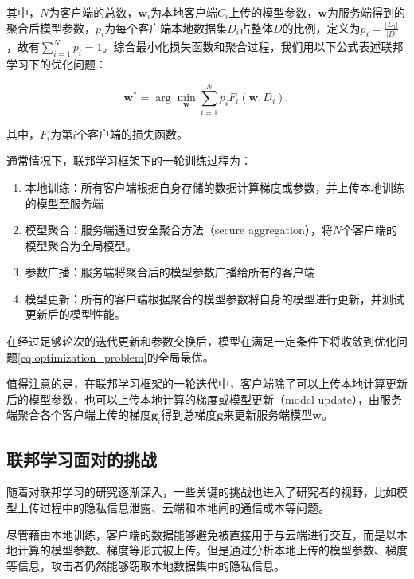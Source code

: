 其中，$N$为客户端的总数，$\mathbf{w}_i$为本地客户端$C_i$上传的模型参数，$\mathbf{w}$为服务端得到的聚合后模型参数，$p_i$为每个客户端本地数据集$D_i$占整体$D$的比例，定义为$p_i=\frac{|D_i|}{|D|}$，故有$\sum_{i = 1}^Np_i = 1$。综合最小化损失函数和聚合过程，我们用以下公式表述联邦学习下的优化问题：

\begin{equation}
  \mathbf{w}^* = \arg\min_{\mathbf{w}}\sum_{i = 1}^{N}p_iF_i(\mathbf{w}, D_i),
  \label{eq:optimization_problem}
\end{equation}

其中，$F_i$为第$i$个客户端的损失函数。

通常情况下，联邦学习框架下的一轮训练过程为：

\begin{enumerate}[label=\textbf{步骤}\ \arabic*, itemindent=1.5em]
  \item 本地训练：所有客户端根据自身存储的数据计算梯度或参数，并上传本地训练的模型至服务端
  \item 模型聚合：服务端通过安全聚合方法（secure aggregation），将$N$个客户端的模型聚合为全局模型。
  \item 参数广播：服务端将聚合后的模型参数广播给所有的客户端
  \item 模型更新：所有的客户端根据聚合的模型参数将自身的模型进行更新，并测试更新后的模型性能。
\end{enumerate}

在经过足够轮次的迭代更新和参数交换后，模型在满足一定条件下将收敛到优化问题\ref{eq:optimization_problem}的全局最优\cite{li2020federated}。

值得注意的是，在联邦学习框架的一轮迭代中，客户端除了可以上传本地计算更新后的模型参数，也可以上传本地计算的梯度或模型更新（model update），由服务端聚合各个客户端上传的梯度$\mathbf{g}_i$得到总梯度$\mathbf{g}$来更新服务端模型$\mathbf{w}$\cite{wei2020federated}。

\subsection{联邦学习面对的挑战}

随着对联邦学习的研究逐渐深入，一些关键的挑战也进入了研究者的视野，比如模型上传过程中的隐私信息泄露、云端和本地间的通信成本等问题\cite{kairouz2021advances}。

尽管藉由本地训练，客户端的数据能够避免被直接用于与云端进行交互，而是以本地计算的模型参数、梯度等形式被上传。但是通过分析本地上传的模型参数、梯度等信息，攻击者仍然能够窃取本地数据集中的隐私信息\cite{li2020federated, wei2020federated}。

